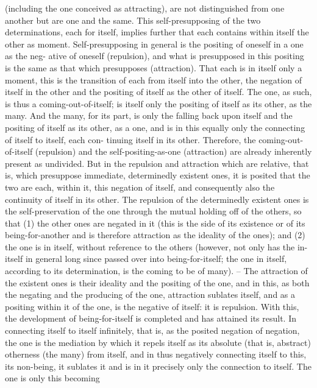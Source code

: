 (including the one conceived as attracting), are not distinguished from one
another but are one and the same.
This self-presupposing of the two determinations, each for itself,
implies further that each contains within itself the other as moment.
Self-presupposing in general is the positing of oneself in a one as the neg-
ative of oneself (repulsion), and what is presupposed in this positing is
the same as that which presupposes (attraction). That each is in itself only
a moment, this is the transition of each from itself into the other, the
negation of itself in the other and the positing of itself as the other of
itself. The one, as such, is thus a coming-out-of-itself; is itself only the
positing of itself as its other, as the many. And the many, for its part, is
only the falling back upon itself and the positing of itself as its other, as a
one, and is in this equally only the connecting of itself to itself, each con-
tinuing itself in its other. Therefore, the coming-out-of-itself (repulsion)
and the self-positing-as-one (attraction) are already inherently present as
undivided. But in the repulsion and attraction which are relative, that is,
which presuppose immediate, determinedly existent ones, it is posited that
the two are each, within it, this negation of itself, and consequently also the
continuity of itself in its other. The repulsion of the determinedly existent
ones is the self-preservation of the one through the mutual holding off of
the others, so that (1) the other ones are negated in it (this is the side of
its existence or of its being-for-another and is therefore attraction as the
ideality of the ones); and (2) the one is in itself, without reference to the
others (however, not only has the in-itself in general long since passed over
into being-for-itself; the one in itself, according to its determination, is
the coming to be of many). – The attraction of the existent ones is their
ideality and the positing of the one, and in this, as both the negating and
the producing of the one, attraction sublates itself, and as a positing within
it of the one, is the negative of itself: it is repulsion.
With this, the development of being-for-itself is completed and has
attained its result. In connecting itself to itself infinitely, that is, as the
posited negation of negation, the one is the mediation by which it repels
itself as its absolute (that is, abstract) otherness (the many) from itself, and
in thus negatively connecting itself to this, its non-being, it sublates it and is
in it precisely only the connection to itself. The one is only this becoming
